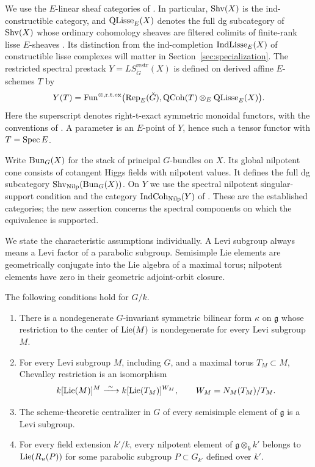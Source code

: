 We use the $E$-linear sheaf categories of \cite{AGKRRV,GR}.
In particular, $\operatorname{Shv}(X)$ is the ind-constructible category, and
$\operatorname{QLisse}_E(X)$ denotes the full dg subcategory of $\operatorname{Shv}(X)$ whose ordinary
cohomology sheaves are filtered colimits of finite-rank lisse $E$-sheaves
\cite[\S1.2.5 and Definition~1.2.6]{AGKRRV}. Its distinction from the
ind-completion $\operatorname{IndLisse}_E(X)$ of constructible lisse complexes will
matter in Section~\ref{sec:specialization}. The restricted spectral
prestack $Y=LS^{\mathrm{restr}}_{\check G}(X)$ is defined on derived affine
$E$-schemes $T$ by
\begin{equation}\label{intro:restricted-stack}
 Y(T)=\operatorname{Fun}^{\otimes,\mathrm{r.t.ex}}
 \bigl(\operatorname{Rep}_E(\check G),\operatorname{QCoh}(T)\otimes_E\operatorname{QLisse}_E(X)\bigr).
\end{equation}
Here the superscript denotes right-t-exact symmetric monoidal functors,
with the conventions of \cite{AGKRRV}. A parameter is an $E$-point of
$Y$, hence such a tensor functor with $T=\operatorname{Spec} E$.

Write $\operatorname{Bun}_G(X)$ for the stack of principal $G$-bundles on $X$.
Its global nilpotent cone consists of cotangent Higgs fields with
nilpotent values. It defines the full dg subcategory
$\operatorname{Shv}_{\operatorname{Nilp}}(\operatorname{Bun}_G(X))$. On $Y$ we use the spectral nilpotent
singular-support condition and the category $\operatorname{IndCoh}_{\operatorname{Nilp}}(Y)$ of
\cite[\S\S21.2.1--21.2.5]{AGKRRV}. These are the established categories; the
new assertion concerns the spectral components on which the equivalence
is supported.

We state the characteristic assumptions individually. A Levi subgroup
always means a Levi factor of a parabolic subgroup. Semisimple Lie
elements are geometrically conjugate into the Lie algebra of a maximal
torus; nilpotent elements have zero in their geometric adjoint-orbit
closure.

\begin{hypothesis}\label{hyp:common}
The following conditions hold for $G/k$.
\begin{enumerate}[label=\textup{(\roman*)}]
\item There is a nondegenerate $G$-invariant symmetric bilinear form
$\kappa$ on $\mathfrak g$ whose restriction to the center of
$\operatorname{Lie}(M)$ is nondegenerate for every Levi subgroup $M$.
\item For every Levi subgroup $M$, including $G$, and a maximal torus
$T_M\subset M$, Chevalley restriction is an isomorphism
\[
 k[\operatorname{Lie}(M)]^M\xrightarrow{\ \sim\ }
 k[\operatorname{Lie}(T_M)]^{W_M},\qquad W_M=N_M(T_M)/T_M.
\]
\item The scheme-theoretic centralizer in $G$ of every semisimple element of
$\mathfrak g$ is a Levi subgroup.
\item For every field extension $k'/k$, every nilpotent element of
$\mathfrak g\otimes_k k'$ belongs to $\operatorname{Lie}(R_u(P))$ for some
parabolic subgroup $P\subset G_{k'}$ defined over $k'$.
\end{enumerate}
\end{hypothesis}

